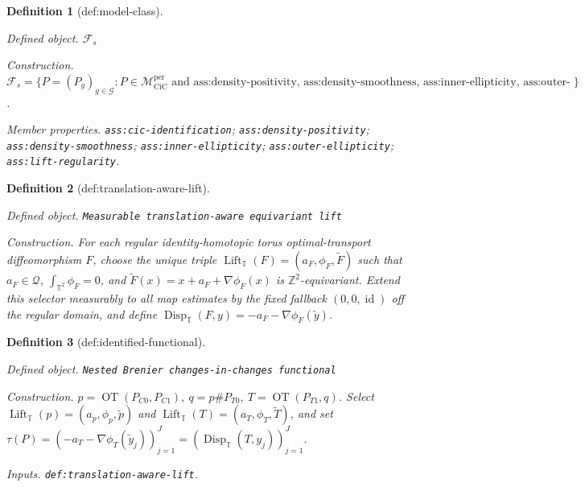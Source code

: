 \documentclass{article}
\newtheorem{definition}{Definition}
\begin{document}
\begin{definition}[def:model-class]\label{def:model-class}
\par\smallskip\noindent\emph{Defined object.} \(\mathcal F_s\)
\par\smallskip\noindent\emph{Construction.} \(\mathcal F_s=\{P=(P_g)_{g\in\mathcal G}:P\in\mathcal M_{\mathrm{CiC}}^{\mathrm{per}}\text{ and ass:density-positivity, ass:density-smoothness, ass:inner-ellipticity, ass:outer-ellipticity, and ass:lift-regularity hold}\}\).
\par\smallskip\noindent\emph{Member properties.} \texttt{ass:\allowbreak{}cic-\allowbreak{}identification}; \texttt{ass:\allowbreak{}density-\allowbreak{}positivity}; \texttt{ass:\allowbreak{}density-\allowbreak{}smoothness}; \texttt{ass:\allowbreak{}inner-\allowbreak{}ellipticity}; \texttt{ass:\allowbreak{}outer-\allowbreak{}ellipticity}; \texttt{ass:\allowbreak{}lift-\allowbreak{}regularity}.
\end{definition}

\begin{definition}[def:translation-aware-lift]\label{def:translation-aware-lift}
\par\smallskip\noindent\emph{Defined object.} \texttt{Measurable translation-\allowbreak{}aware equivariant lift}
\par\smallskip\noindent\emph{Construction.} For each regular identity-homotopic torus optimal-transport diffeomorphism \(F\), choose the unique triple \(\operatorname{Lift}_{\mathbb T}(F)=(a_F,\phi_F,\widetilde F)\) such that \(a_F\in\mathcal Q\), \(\int_{\mathbb T^2}\phi_F=0\), and \(\widetilde F(x)=x+a_F+\nabla\phi_F(x)\) is \(\mathbb Z^2\)-equivariant. Extend this selector measurably to all map estimates by the fixed fallback \((0,0,\operatorname{id})\) off the regular domain, and define \(\operatorname{Disp}_{\mathbb T}(F,y)=-a_F-\nabla\phi_F(\widetilde y)\).
\end{definition}

\begin{definition}[def:identified-functional]\label{def:identified-functional}
\par\smallskip\noindent\emph{Defined object.} \texttt{Nested Brenier changes-\allowbreak{}in-\allowbreak{}changes functional}
\par\smallskip\noindent\emph{Construction.} \(p=\operatorname{OT}(P_{C0},P_{C1}),\ q=p\#P_{T0},\ T=\operatorname{OT}(P_{T1},q)\). Select \(\operatorname{Lift}_{\mathbb T}(p)=(a_p,\phi_p,\widetilde p)\) and \(\operatorname{Lift}_{\mathbb T}(T)=(a_T,\phi_T,\widetilde T)\), and set \(\tau(P)=(-a_T-\nabla\phi_T(\widetilde y_j))_{j=1}^J=(\operatorname{Disp}_{\mathbb T}(T,y_j))_{j=1}^J\).
\par\smallskip\noindent\emph{Inputs.} \texttt{def:\allowbreak{}translation-\allowbreak{}aware-\allowbreak{}lift}.
\end{definition}
\end{document}
